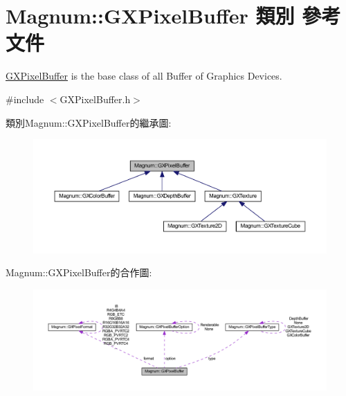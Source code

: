 \hypertarget{class_magnum_1_1_g_x_pixel_buffer}{}\section{Magnum\+:\+:G\+X\+Pixel\+Buffer 類別 參考文件}
\label{class_magnum_1_1_g_x_pixel_buffer}


\hyperlink{class_magnum_1_1_g_x_pixel_buffer}{G\+X\+Pixel\+Buffer} is the base class of all Buffer of Graphics Devices.  




{\ttfamily \#include $<$G\+X\+Pixel\+Buffer.\+h$>$}



類別\+Magnum\+:\+:G\+X\+Pixel\+Buffer的繼承圖\+:\nopagebreak
\begin{figure}[H]
\begin{center}
\leavevmode
\includegraphics[width=350pt]{class_magnum_1_1_g_x_pixel_buffer__inherit__graph}
\end{center}
\end{figure}


Magnum\+:\+:G\+X\+Pixel\+Buffer的合作圖\+:\nopagebreak
\begin{figure}[H]
\begin{center}
\leavevmode
\includegraphics[width=350pt]{class_magnum_1_1_g_x_pixel_buffer__coll__graph}
\end{center}
\end{figure}
